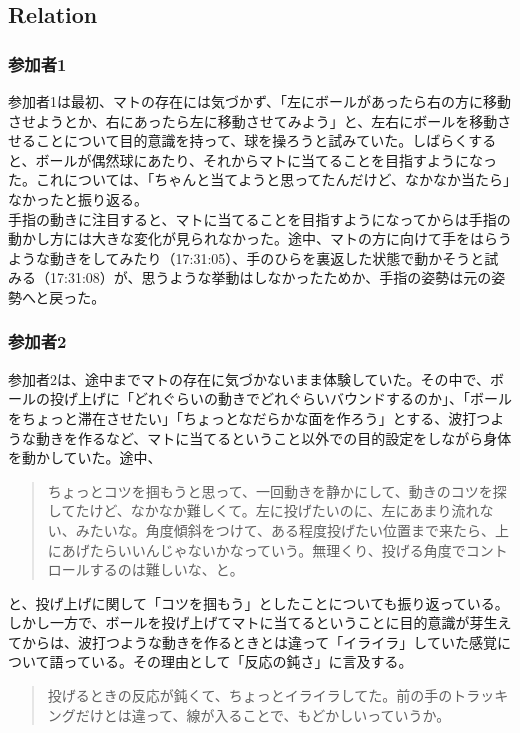 \subsection{Relation}
\subsubsection*{参加者1}
参加者1は最初、マトの存在には気づかず、「左にボールがあったら右の方に移動させようとか、右にあったら左に移動させてみよう」と、左右にボールを移動させることについて目的意識を持って、球を操ろうと試みていた。しばらくすると、ボールが偶然球にあたり、それからマトに当てることを目指すようになった。これについては、「ちゃんと当てようと思ってたんだけど、なかなか当たら」なかったと振り返る。\\
手指の動きに注目すると、マトに当てることを目指すようになってからは手指の動かし方には大きな変化が見られなかった。途中、マトの方に向けて手をはらうような動きをしてみたり（17:31:05）、手のひらを裏返した状態で動かそうと試みる（17:31:08）が、思うような挙動はしなかったためか、手指の姿勢は元の姿勢へと戻った。
\subsubsection*{参加者2}
参加者2は、途中までマトの存在に気づかないまま体験していた。その中で、ボールの投げ上げに「どれぐらいの動きでどれぐらいバウンドするのか」、「ボールをちょっと滞在させたい」「ちょっとなだらかな面を作ろう」とする、波打つような動きを作るなど、マトに当てるということ以外での目的設定をしながら身体を動かしていた。途中、
\begin{quote}
  ちょっとコツを掴もうと思って、一回動きを静かにして、動きのコツを探してたけど、なかなか難しくて。左に投げたいのに、左にあまり流れない、みたいな。角度傾斜をつけて、ある程度投げたい位置まで来たら、上にあげたらいいんじゃないかなっていう。無理くり、投げる角度でコントロールするのは難しいな、と。  
\end{quote}
と、投げ上げに関して「コツを掴もう」としたことについても振り返っている。しかし一方で、ボールを投げ上げてマトに当てるということに目的意識が芽生えてからは、波打つような動きを作るときとは違って「イライラ」していた感覚について語っている。その理由として「反応の鈍さ」に言及する。
\begin{quote}
  投げるときの反応が鈍くて、ちょっとイライラしてた。前の手のトラッキングだけとは違って、線が入ることで、もどかしいっていうか。  
\end{quote}
